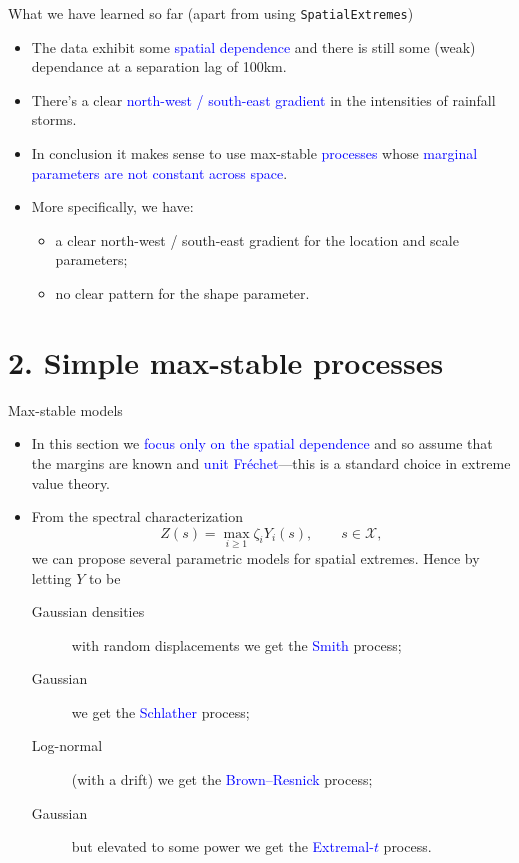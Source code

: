 \documentclass[mode=present,style=simple,paper=screen]{powerdot}
\theoremstyle{plain}%
\theoremstyle{definition}
\theoremstyle{remark}
\begin{document}
\begin{slide}[toc=Debrief \#1]{What we have learned so far (apart from
    using \texttt{SpatialExtremes})}
  \begin{itemize}
  \item The data exhibit some \textcolor{blue}{spatial
      dependence} and there is still some (weak) dependance at a
    separation lag of 100km.
  \item There's a clear \textcolor{blue}{north-west / south-east
      gradient} in the intensities of rainfall storms.
  \item In conclusion it makes sense to use max-stable
    \textcolor{blue}{processes} whose \textcolor{blue}{marginal
      parameters are not constant across space}.
  \item More specifically, we have:
    \begin{itemize}
    \item a clear north-west / south-east gradient for the location
      and scale parameters;
    \item no clear pattern for the shape parameter.
    \end{itemize}
  \end{itemize}
\end{slide}

\section{2. Simple max-stable processes}

\begin{slide}{Max-stable models}
  \begin{itemize}
  \item In this section we \textcolor{blue}{focus only on the spatial
      dependence} and so assume that the margins are known and
    \textcolor{blue}{unit Fréchet}---this is a standard choice in
    extreme value theory.
  \item From the spectral characterization
    \begin{equation*}
      Z(s) = \max_{i \geq 1} \zeta_i Y_i(s), \qquad s \in \mathcal{X},
    \end{equation*}
    we can propose several parametric models for spatial
    extremes. Hence by letting $Y$ to be
    \begin{description}
    \item[Gaussian densities] with random displacements we get the
      \textcolor{blue}{Smith} process;
    \item[Gaussian] we get the \textcolor{blue}{Schlather} process;
    \item[Log-normal] (with a drift) we get the \textcolor{blue}{Brown--Resnick} process;
    \item[Gaussian] but elevated to some power we get the
      \textcolor{blue}{Extremal-$t$} process.
    \end{description}
  \end{itemize}
\end{slide}
\end{document}

